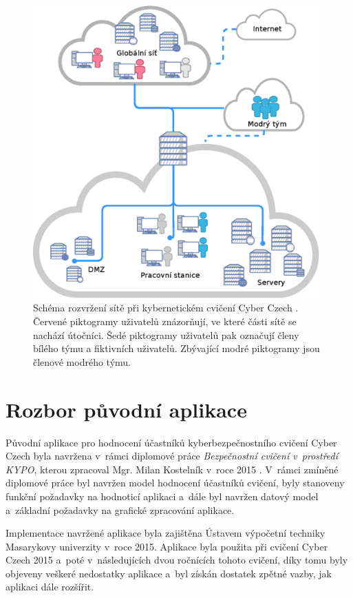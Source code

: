 \documentclass[
  digital,
  twoside,
  table, 
  nolof, 
  nolot
]{fithesis3}
\begin{document}
\begin{figure}[ht]
    \centering
    \includegraphics[width=11cm]{images/kypo-network.eps}
    \caption{Schéma rozvržení sítě při kybernetickém cvičení Cyber Czech \cite{Vykopal2017LessonsRange}. Červené piktogramy uživatelů znázorňují, ve které části sítě se nachází útočníci. Šedé piktogramy uživatelů pak označují členy bílého týmu a fiktivních uživatelů. Zbývající modré piktogramy jsou členové modrého týmu.}
    \label{fig:kypoNetwork}
\end{figure}


\chapter{Rozbor původní aplikace}
\label{oldApp}

Původní aplikace pro hodnocení účastníků kyberbezpečnostního cvičení Cyber Czech byla navržena v~rámci diplomové práce \emph{Bezpečnostní cvičení v~prostředí KYPO}, kterou zpracoval Mgr. Milan Kostelník v~roce 2015 \cite{Kostelnik2016thesis}. V~rámci zmíněné diplomové práce byl navržen model hodnocení účastníků cvičení, byly stanoveny funkční požadavky na hodnoticí aplikaci a~dále byl navržen datový model a~základní požadavky na grafické zpracování aplikace. 

Implementace navržené aplikace byla zajištěna Ústavem výpočetní techniky Masarykovy univerzity v~roce 2015. Aplikace byla použita při cvičení Cyber Czech 2015 a~poté v~následujících dvou ročnících tohoto cvičení, díky tomu byly objeveny veškeré nedostatky aplikace a~byl získán dostatek zpětné vazby, jak aplikaci dále rozšířit.
\end{document}
